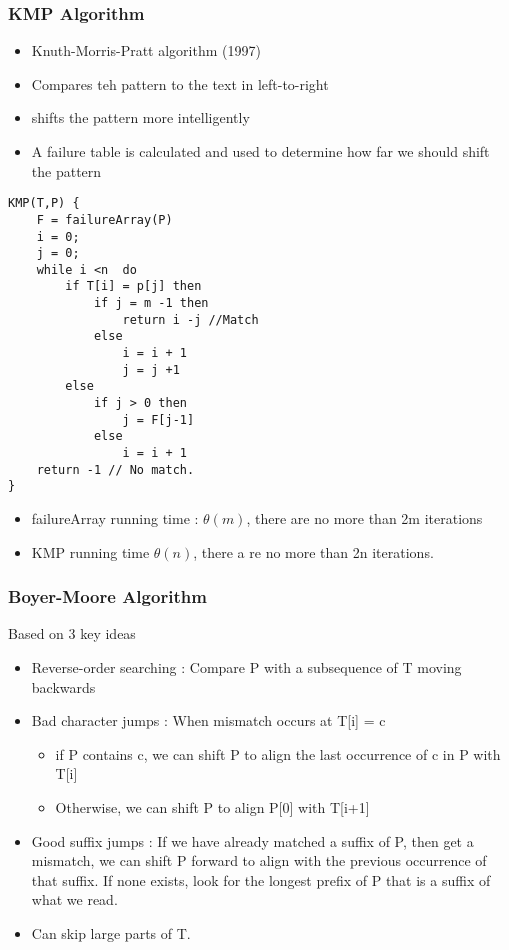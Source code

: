 \documentclass{article}
\begin{document}
\subsubsection*{KMP Algorithm}
\begin{itemize}
\item Knuth-Morris-Pratt algorithm (1997)
\item Compares teh pattern to the text in left-to-right 
\item shifts the pattern more intelligently 
\item A failure table is calculated and used to determine how far we should shift the pattern
\end{itemize}

\begin{lstlisting}
KMP(T,P) {
	F = failureArray(P)
	i = 0;
	j = 0;
	while i <n  do 
		if T[i] = p[j] then 
			if j = m -1 then 
				return i -j //Match 
			else 
				i = i + 1
				j = j +1
		else 
			if j > 0 then 
				j = F[j-1]
			else 
				i = i + 1
	return -1 // No match.  
}
\end{lstlisting}

\begin{itemize}
\item failureArray running time : \(\theta(m)\), there are no more than 2m iterations 
\item KMP running time \(\theta(n)\), there a re no more than 2n iterations. 
\end{itemize}

\subsubsection*{Boyer-Moore Algorithm}
Based on 3 key ideas 
\begin{itemize}
\item Reverse-order searching : Compare P with a subsequence of T moving backwards
\item Bad character jumps : When mismatch occurs at T[i] = c
\begin{itemize}
\item if P contains c, we can shift P to align the last occurrence of c in P with T[i]
\item Otherwise, we can shift P to align P[0] with T[i+1]
\end{itemize}
\item Good suffix jumps : If we have already matched a suffix of P, then get a mismatch, we can shift P forward to align with the previous occurrence of that suffix. If none exists, look for the longest prefix of P that is a suffix of what we read. 
\item Can skip large parts of T. 
\end{itemize}
\end{document}
